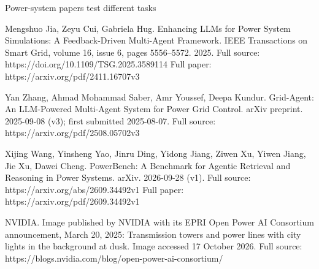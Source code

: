 \begin{frame}[t]{Power-system papers test different tasks}
{Mengshuo Jia, Zeyu Cui, Gabriela Hug. Enhancing LLMs for Power System Simulations: A Feedback-Driven Multi-Agent Framework. IEEE Transactions on Smart Grid, volume 16, issue 6, pages 5556--5572. 2025.
Full source: https://doi.org/10.1109/TSG.2025.3589114
Full paper: https://arxiv.org/pdf/2411.16707v3

Yan Zhang, Ahmad Mohammad Saber, Amr Youssef, Deepa Kundur. Grid-Agent: An LLM-Powered Multi-Agent System for Power Grid Control. arXiv preprint. 2025-09-08 (v3); first submitted 2025-08-07.
Full source: https://arxiv.org/pdf/2508.05702v3

Xijing Wang, Yinsheng Yao, Jinru Ding, Yidong Jiang, Ziwen Xu, Yiwen Jiang, Jie Xu, Dawei Cheng. PowerBench: A Benchmark for Agentic Retrieval and Reasoning in Power Systems. arXiv. 2026-09-28 (v1).
Full source: https://arxiv.org/abs/2609.34492v1
Full paper: https://arxiv.org/pdf/2609.34492v1

NVIDIA. Image published by NVIDIA with its EPRI Open Power AI Consortium announcement, March 20, 2025: Transmission towers and power lines with city lights in the background at dusk. Image accessed 17 October 2026.
Full source: https://blogs.nvidia.com/blog/open-power-ai-consortium/}
\end{frame}

